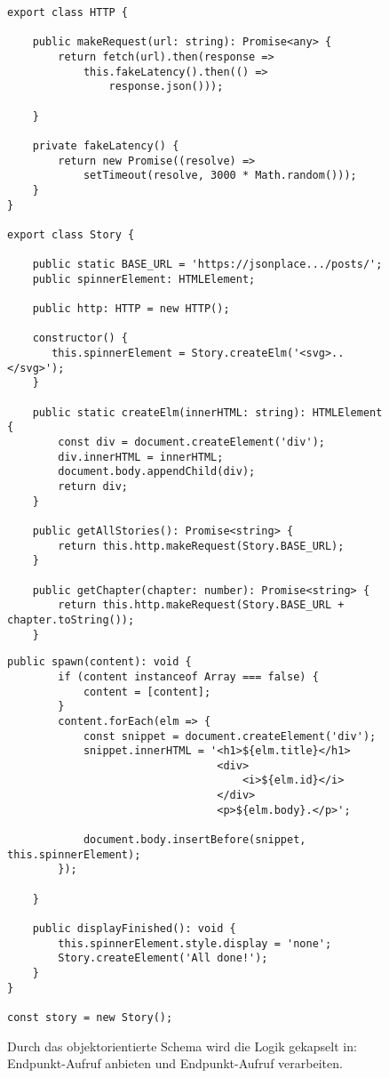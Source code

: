 \begin{figure}[H]
\begin{lstlisting}[basicstyle=\small]
export class HTTP {

    public makeRequest(url: string): Promise<any> {
        return fetch(url).then(response =>
            this.fakeLatency().then(() =>
                response.json()));

    }

    private fakeLatency() {
        return new Promise((resolve) =>
            setTimeout(resolve, 3000 * Math.random()));
    }
}

export class Story {

    public static BASE_URL = 'https://jsonplace.../posts/';
    public spinnerElement: HTMLElement;

    public http: HTTP = new HTTP();

    constructor() {
       this.spinnerElement = Story.createElm('<svg>..</svg>');
    }

    public static createElm(innerHTML: string): HTMLElement {
        const div = document.createElement('div');
        div.innerHTML = innerHTML;
        document.body.appendChild(div);
        return div;
    }
    
    public getAllStories(): Promise<string> {
        return this.http.makeRequest(Story.BASE_URL);
    }

    public getChapter(chapter: number): Promise<string> {
        return this.http.makeRequest(Story.BASE_URL + chapter.toString());
    }
\end{lstlisting}
\end{figure}

\begin{figure}[H]\ContinuedFloat
\begin{lstlisting}[basicstyle=\small]
    public spawn(content): void {
        if (content instanceof Array === false) {
            content = [content];
        }
        content.forEach(elm => {
            const snippet = document.createElement('div');
            snippet.innerHTML = '<h1>${elm.title}</h1>
                                 <div>
                                     <i>${elm.id}</i>
                                 </div>
                                 <p>${elm.body}.</p>';

            document.body.insertBefore(snippet, this.spinnerElement);
        });

    }
    
    public displayFinished(): void {
        this.spinnerElement.style.display = 'none';
        Story.createElement('All done!');
    }
}

const story = new Story();
\end{lstlisting}
\caption{Durch das objektorientierte Schema wird die Logik gekapselt in: Endpunkt-Aufruf anbieten und Endpunkt-Aufruf verarbeiten.}
\end{figure}

